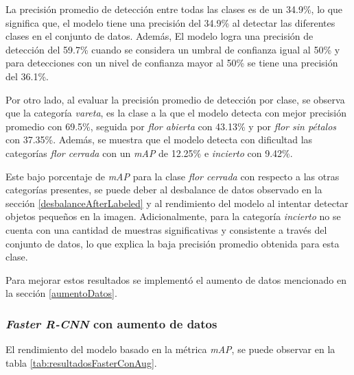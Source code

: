 La precisión promedio de detección entre todas las clases es de un 34.9\%, lo que significa que, el modelo tiene una precisión del 34.9\% al detectar las diferentes clases en el conjunto de datos. Además, El modelo logra una precisión de detección del 59.7\% cuando se considera un umbral de confianza igual al 50\% y para detecciones con un nivel de confianza mayor al 50\% se tiene una precisión del 36.1\%.

Por otro lado, al evaluar la precisión promedio de detección por clase, se observa que la categoría \textit{vareta}, es la clase a la que el modelo detecta con mejor precisión promedio con 69.5\%, seguida por \textit{flor abierta} con 43.13\% y por \textit{flor sin pétalos} con 37.35\%. Además, se muestra que el modelo detecta con dificultad las categorías \textit{flor cerrada} con un \textit{mAP} de 12.25\% e \textit{incierto} con 9.42\%.

Este bajo porcentaje de \textit{mAP} para la clase \textit{flor cerrada} con respecto a las otras categorías presentes, se puede deber al desbalance de datos observado en la sección \ref{desbalanceAfterLabeled} y al rendimiento del modelo al intentar detectar objetos pequeños en la imagen. Adicionalmente, para la categoría \textit{incierto} no se cuenta con una cantidad de muestras significativas y consistente a través del conjunto de datos, lo que explica la baja precisión promedio obtenida para esta clase.

Para mejorar estos resultados se implementó el aumento de datos mencionado en la sección \ref{aumentoDatos}.

\subsubsection{\textit{Faster R-CNN} con aumento de datos}

El rendimiento del modelo basado en la métrica \textit{mAP}, se puede observar en la tabla \ref{tab:resultadosFasterConAug}. 

